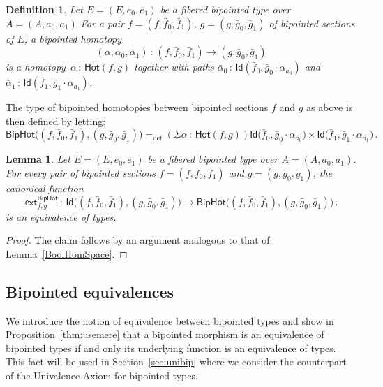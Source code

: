\documentclass[10pt,a4paper,oneside,reqno]{amsart}
\numberwithin{equation}{section}
\theoremstyle{mythm}
\newtheorem{lemma}[theorem]{Lemma}
\theoremstyle{mydef}
\newtheorem{definition}[theorem]{Definition}
\theoremstyle{myrmk}
\newcommand{\defeq}{=_{\mathrm{def}}}
\newcommand{\co}{\,{:}\,}
\newcommand{\ct}{\cdot}
\newcommand{\Hot}{\mathsf{Hot}}
\newcommand{\ext}{\mathsf{ext}}
\newcommand{\Id}{\mathsf{Id}}
\newcommand{\BipHot}{\mathsf{BipHot}}
\begin{document}
\begin{definition} \label{def:2cellsection} Let $E = (E, e_0, e_1)$ be a fibered bipointed type over
$A = (A, a_0, a_1)$ For a pair $f = (f, \bar{f}_0,\bar{f}_1)$, $g = (g, \bar{g}_0, \bar{g}_1)$ of  bipointed sections of $E$, a \emph{bipointed homotopy} 
\[
(\alpha, \bar{\alpha}_0, \bar{\alpha}_1) \co (f, \bar{f}_0, \bar{f}_1)  \rightarrow (g, \bar{g}_0, \bar{g}_1)
\]
is a homotopy~$\alpha \co \Hot(f, g)$ together with paths $\bar{\alpha}_0 \co \Id(  \bar{f}_0 ,  \bar{g}_0 \ct \alpha_{a_0}  )$ and $\bar{\alpha}_1 \co \Id(
\bar{f}_1 , \bar{g}_1 \ct  \alpha_{a_1})$.
\end{definition} 



The type of bipointed homotopies between bipointed sections $f$ and $g$ as above is then defined by letting:
\[
\BipHot \big( (f, \bar{f}_0, \bar{f}_1), (g, \bar{g}_0, \bar{g}_1) \big) \defeq
(\Sigma \alpha \co \Hot( f, g)) 
\Id\big( \bar{f}_0 ,   \bar{g}_0 \ct \alpha_{a_0}  \big) \times 
  \Id \big( \bar{f}_1,    \bar{g}_1 \ct \alpha_{a_1}  \big) 
 \, .
\]


\begin{lemma} \label{thm:biphot}
Let $E = (E, e_0, e_1)$ be a fibered bipointed type over  $A = (A, a_0, a_1)$. 
For every pair of bipointed sections $f = (f, \bar{f}_0, \bar{f}_1)$ and $g = (g, \bar{g}_0, \bar{g}_1)$, 
the canonical function
\[
\ext^{\BipHot}_{f,g} \co \Id\big( (f, \bar{f}_0, \bar{f}_1), (g, \bar{g}_0, \bar{g}_1) \big) \rightarrow
\BipHot \big( (f, \bar{f}_0, \bar{f}_1), (g, \bar{g}_0, \bar{g}_1) \big) \, .
\]
is an equivalence of types. 
\end{lemma}


\begin{proof} The claim follows by an argument analogous to that of Lemma~\ref{BoolHomSpace}.
\end{proof}




\subsection{Bipointed equivalences} We introduce the notion of equivalence between bipointed types and show
in Proposition~\ref{thm:usemere}  that a bipointed morphism is an equivalence of bipointed types if and only its underlying function is an equivalence of types. This fact will be used in Section~\ref{sec:unibip} where we consider the counterpart of the Univalence Axiom for bipointed types. 
\end{document}
